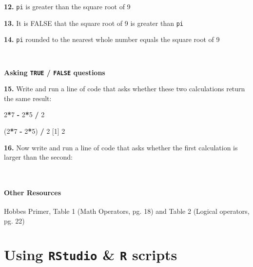 \documentclass[]{book}
\newenvironment{Shaded}{\begin{snugshade}}{\end{snugshade}}
\newcommand{\DecValTok}[1]{\textcolor[rgb]{0.00,0.00,0.81}{#1}}
\newcommand{\NormalTok}[1]{#1}
\newcommand{\OperatorTok}[1]{\textcolor[rgb]{0.81,0.36,0.00}{\textbf{#1}}}
\newcommand{\StringTok}[1]{\textcolor[rgb]{0.31,0.60,0.02}{#1}}
\begin{document}
\textbf{12.} \texttt{pi} is greater than the square root of 9

\textbf{13.} It is FALSE that the square root of 9 is greater than \texttt{pi}

\textbf{14.} \texttt{pi} rounded to the nearest whole number equals the square root of 9

~

\textbf{Asking \texttt{TRUE} / \texttt{FALSE} questions}

\textbf{15.} Write and run a line of code that asks whether these two calculations return the same result:

\begin{Shaded}
\begin{Highlighting}[]
\DecValTok{2}\OperatorTok{*}\DecValTok{7} \OperatorTok{-}\StringTok{ }\DecValTok{2}\OperatorTok{*}\DecValTok{5} \OperatorTok{/}\StringTok{ }\DecValTok{2}
\end{Highlighting}
\end{Shaded}

\begin{Shaded}
\begin{Highlighting}[]
\NormalTok{(}\DecValTok{2}\OperatorTok{*}\DecValTok{7} \OperatorTok{-}\StringTok{ }\DecValTok{2}\OperatorTok{*}\DecValTok{5}\NormalTok{) }\OperatorTok{/}\StringTok{ }\DecValTok{2}
\NormalTok{[}\DecValTok{1}\NormalTok{] }\DecValTok{2}
\end{Highlighting}
\end{Shaded}

\textbf{16.} Now write and run a line of code that asks whether the first calculation is larger than the second:

~

\hypertarget{other-resources}{%
\subsubsection*{Other Resources}\label{other-resources}}

Hobbes Primer, Table 1 (Math Operators, pg. 18) and Table 2 (Logical operators, pg. 22)

\hypertarget{using-rstudio-r-scripts}{%
\chapter{\texorpdfstring{Using \texttt{RStudio} \& \texttt{R} scripts}{Using RStudio \& R scripts}}\label{using-rstudio-r-scripts}}
\end{document}
